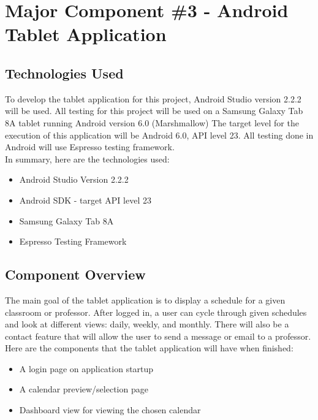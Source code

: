 
\section{Major Component \#3 - Android Tablet Application}

\subsection{Technologies  Used}
To develop the tablet application for this project, Android Studio version 2.2.2 will be used. All testing for this project will be used on a Samsung Galaxy Tab 8A tablet running Android version 6.0 (Marshmallow) The target level for the execution of this application will be Android 6.0, API level 23. All testing done in Android will use Espresso testing framework.\\

In summary, here are the technologies used:

\begin{itemize}
\item Android Studio Version 2.2.2
\item Android SDK - target API level 23
\item Samsung Galaxy Tab 8A
\item Espresso Testing Framework
\end{itemize}



\subsection{Component  Overview}
The main goal of the tablet application is to display a schedule for a given classroom or professor. After logged in, a user can cycle through given schedules and look at different views: daily, weekly, and monthly.  There will also be a contact feature that will allow the user to send a message or email to a professor. \\

Here are the components that the tablet application will have when finished:

\begin{itemize}
\item A login page on application startup
\item A calendar preview/selection page
\item Dashboard view for viewing the chosen calendar
\end{itemize}

